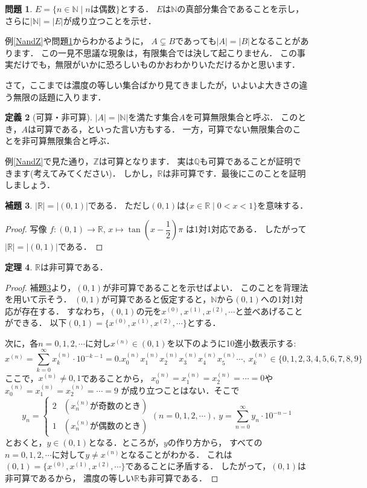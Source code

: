 \documentclass[./main]{subfiles} %
\theoremstyle{definition}
\newtheorem{hamadadefi}{定義}[section]
\newtheorem{hamadaqst}[hamadadefi]{問題}
\newtheorem{hamadathm}[hamadadefi]{定理}
\newtheorem{hamadalem}[hamadadefi]{補題}
\begin{document}
\begin{hamadaqst}
\label{Nand2N}
$E=\{n\in\mathbb{N}\mid nは偶数\}$とする．
$E$は$\mathbb{N}$の真部分集合であることを示し，
さらに$|\mathbb{N}|=|E|$が成り立つことを示せ．
\end{hamadaqst}

例\ref{NandZ}や問題\ref{Nand2N}からわかるように，
$A\subsetneq B$であっても$|A|=|B|$となることがあります．
この一見不思議な現象は，有限集合では決して起こりません．
この事実だけでも，無限がいかに恐ろしいものかおわかりいただけるかと思います．

さて，ここまでは濃度の等しい集合ばかり見てきましたが，いよいよ大きさの違う無限の話題に入ります．

\begin{hamadadefi}[可算・非可算]
$|A|=|\mathbb{N}|$を満たす集合$A$を可算無限集合と呼ぶ．
このとき，$A$は可算である，といった言い方もする．
一方，可算でない無限集合のことを非可算無限集合と呼ぶ．
\end{hamadadefi}

例\ref{NandZ}で見た通り，$\mathbb{Z}$は可算となります．
実は$\mathbb{Q}$も可算であることが証明できます(考えてみてください)．
しかし，$\mathbb{R}$は非可算です．最後にこのことを証明しましょう．

\begin{hamadalem}
\label{real01}
$|\mathbb{R}|=|(0,1)|$である．
ただし$(0,1)$は$\{x\in\mathbb{R}\mid0<x<1\}$を意味する．
\end{hamadalem}
\begin{proof}
写像
$f\colon(0,1)\to\mathbb{R}$, $x\mapsto\tan\left(x-\dfrac{1}{2}\right)\pi$
は1対1対応である．
したがって$|\mathbb{R}|=|(0,1)|$である．
\end{proof}

\begin{hamadathm}
\label{cantor}
$\mathbb{R}$は非可算である．
\end{hamadathm}
\begin{proof}
補題\ref{real01}より，$(0,1)$が非可算であることを示せばよい．
このことを背理法を用いて示そう．
$(0,1)$が可算であると仮定すると，$\mathbb{N}$から$(0,1)$への1対1対応が存在する．
すなわち，$(0,1)$の元を$x^{(0)},x^{(1)},x^{(2)},\cdots$と並べあげることができる．
以下$(0,1)=\{x^{(0)},x^{(1)},x^{(2)},\cdots\}$とする．

次に，各$n=0,1,2,\cdots$に対し$x^{(n)}\in(0,1)$を以下のように10進小数表示する:
\[
x^{(n)}=\sum_{k=0}^\infty x_k^{(n)}\cdot10^{-k-1}
=0.x_0^{(n)}x_1^{(n)}x_2^{(n)}x_3^{(n)}x_4^{(n)}x_5^{(n)}\cdots,\ 
x_k^{(n)}\in\{0,1,2,3,4,5,6,7,8,9\}
\]
ここで，$x^{(n)}\neq0,1$であることから，
$x_0^{(n)}=x_1^{(n)}=x_2^{(n)}=\cdots=0$や$x_0^{(n)}=x_1^{(n)}=x_2^{(n)}=\cdots=9$
が成り立つことはない．そこで
\[
y_n=
\begin{cases}
2 & (x_n^{(n)}が奇数のとき)\\
1 & (x_n^{(n)}が偶数のとき)
\end{cases}
(n=0,1,2,\cdots),\ 
y=\sum_{n=0}^\infty y_n\cdot10^{-n-1}
\]
とおくと，$y\in(0,1)$となる．ところが，$y$の作り方から，
すべての$n=0,1,2,\cdots$に対して$y\neq x^{(n)}$となることがわかる．
これは$(0,1)=\{x^{(0)},x^{(1)},x^{(2)},\cdots\}$であることに矛盾する．
したがって，$(0,1)$は非可算であるから，
濃度の等しい$\mathbb{R}$も非可算である．
\end{proof}
\end{document}
